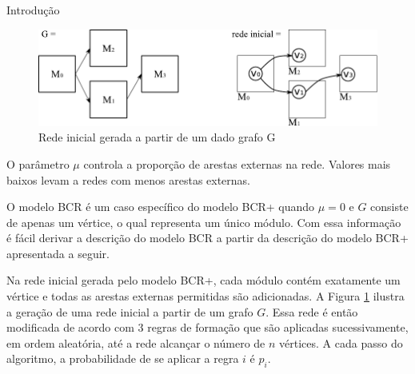 \begin{section}{Introdução}
	\begin{figure}[htbp]
		\centering
			\includegraphics[scale=1]{figuras/exemplo-bcr-g}
		\caption{Rede inicial gerada a partir de um dado grafo G}
		\label{fig:bcr-g}
	\end{figure}

	O parâmetro $\mu$ controla a proporção de arestas externas na rede. Valores mais baixos levam a redes com menos arestas externas.

	O modelo BCR é um caso específico do modelo BCR+ quando $\mu = 0$ e $G$ consiste de apenas um vértice, o qual representa um único módulo. Com essa informação é fácil derivar a descrição do modelo BCR a partir da descrição do modelo BCR+ apresentada a seguir.
	
	Na rede inicial gerada pelo modelo BCR+, cada módulo contém exatamente um vértice e todas as arestas externas permitidas são adicionadas. A Figura \ref{fig:bcr-g} ilustra a geração de uma rede inicial a partir de um grafo $G$. Essa rede é então modificada de acordo com 3 regras de formação que são aplicadas sucessivamente, em ordem aleatória, até a rede alcançar o número de $n$ vértices. A cada passo do algoritmo, a probabilidade de se aplicar a regra $i$ é $p_i$.
	
\end{section}

